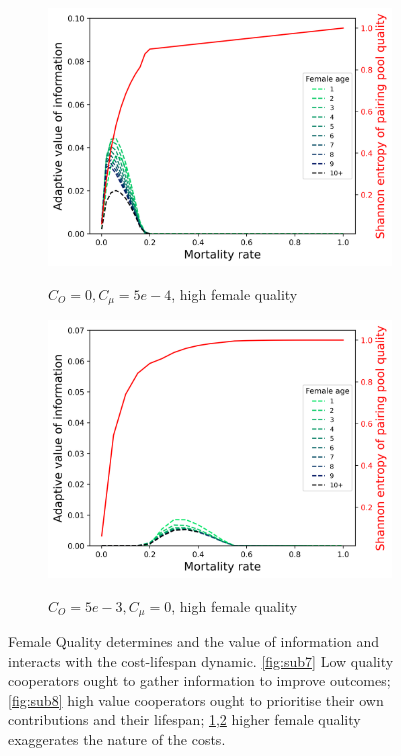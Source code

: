 \documentclass[10pt]{article} %
\begin{document}
\begin{figure}
\begin{subfigure}{.5\textwidth}
\centering
\caption{$C_O = 0, C_\mu = 5e-4$, high female quality}
\includegraphics[width=1.\linewidth]{../figures/Mort_Co_fvH.png}
\label{fig:sub9}%
\end{subfigure}%
\begin{subfigure}{.5\textwidth}
\centering
\caption{$C_O = 5e-3, C_\mu = 0$, high female quality}
\includegraphics[width=1.\linewidth]{../figures/FemMort.png}
\label{fig:sub10}%
\end{subfigure}%
\caption{Female Quality determines and the value of information and interacts with the cost-lifespan dynamic. \ref{fig:sub7} Low quality cooperators ought to gather information to improve outcomes; \ref{fig:sub8} high value cooperators ought to prioritise their own contributions and their lifespan; \ref{fig:sub9},\ref{fig:sub10} higher female quality exaggerates the nature of the costs.}
\label{fig:6}
\end{figure}
\end{document}
